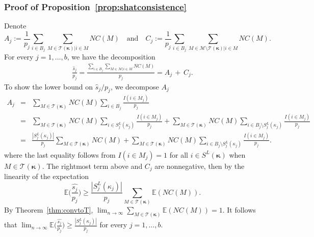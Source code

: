 \documentclass[
  12pt]{article}
\newcommand{\E}{\mathbb{E}}
\newcommand{\M}{\mathcal{M}}
\newcommand{\T}{\mathcal{T}}
\newcommand{\bkappa}{\boldsymbol{\kappa}}
\begin{document}
\subsubsection{Proof of Proposition~\ref{prop:shatconsistence}}
Denote
$$A_j:=\frac{1}{p_j}\sum_{i \in B_j}\sum_{M \in \T(\bkappa)|i\in M}NC(M) \quad\text{and}\quad  C_j:=\frac{1}{p_j}\sum_{i \in B_j}\sum_{M \in \M\setminus \T(\bkappa)|i\in M}NC(M).$$
For every $j=1,\ldots,b$, we have the decomposition
\begin{gather}\label{eq:decompshat}
    \frac{\hat{s}_j}{p_j}
    =\frac{\sum_{i \in B_j} \sum_{M \in \M | i \in M} NC(M)}{p_j}
   =A_j\,+\, C_j.
\end{gather}
To show the lower bound on $\hat{s}_j/p_j$, we decompose $A_j$
\begin{eqnarray}
  A_j
   &=& \sum_{M \in \T(\bkappa)}NC(M)\sum_{i \in B_j}\frac{I(i\in M_j)}{p_j}\nonumber\\
   &=& \sum_{M \in \T(\bkappa)}NC(M)\sum_{i \in S_j^{L}(\kappa_j)}\frac{I(i\in M_j)}{p_j}+\sum_{M \in \T(\bkappa)}NC(M)\sum_{i \in B_j\setminus S_j^{L}(\kappa_j)}\frac{I(i\in M_j)}{p_j}\nonumber\\
   &=& \frac{|S_j^{L}(\kappa_j)|}{p_j}\sum_{M \in \T(\bkappa)}NC(M)+\sum_{M \in \T(\bkappa)}NC(M)\sum_{i \in B_j\setminus S_j^{L}(\kappa_j)}\frac{I(i\in M_j)}{p_j}\label{eq:wigr}.
\end{eqnarray}
where the last equality follows from $I(i\in M_j)=1$ for all $i\in S^L(\bkappa)$ when $M\in\T(\bkappa)$. The rightmost term above and $C_j$ are nonnegative, then by the linearity of the expectation
$$\E\Big(\frac{\widehat{s_j}}{p_j}\Big)\geq\frac{|S_j^{L}(\kappa_j)|}{p_j}\sum_{M \in \T(\bkappa)}\E(NC(M)).$$
By Theorem~\ref{thm:convtoT}, $\lim_{n\to\infty}\sum_{M \in \T(\bkappa)}\E(NC(M))=1$. It follows that $\lim_{n\to\infty}\E\Big(\frac{\widehat{s_j}}{p_j}\Big)\geq \frac{|S_j^{L}(\kappa_j)|}{p_j}$ for every $j=1,\ldots,b$.
\end{document}
